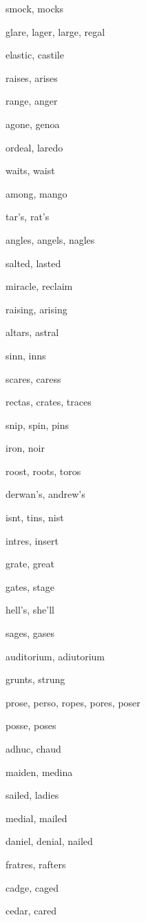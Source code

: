     \item smock, mocks
    \item glare, lager, large, regal
    \item elastic, castile
    \item raises, arises
    \item range, anger
    \item agone, genoa
    \item ordeal, laredo
    \item waits, waist
    \item among, mango
    \item tar's, rat's
    \item angles, angels, nagles
    \item salted, lasted
    \item miracle, reclaim
    \item raising, arising
    \item altars, astral
    \item sinn, inns
    \item scares, caress
    \item rectas, crates, traces
    \item snip, spin, pins
    \item iron, noir
    \item roost, roots, toros
    \item derwan's, andrew's
    \item isnt, tins, nist
    \item intres, insert
    \item grate, great
    \item gates, stage
    \item hell's, she'll
    \item sages, gases
    \item auditorium, adiutorium
    \item grunts, strung
    \item prose, perso, ropes, pores, poser
    \item posse, poses
    \item adhuc, chaud
    \item maiden, medina
    \item sailed, ladies
    \item medial, mailed
    \item daniel, denial, nailed
    \item fratres, rafters
    \item cadge, caged
    \item cedar, cared
